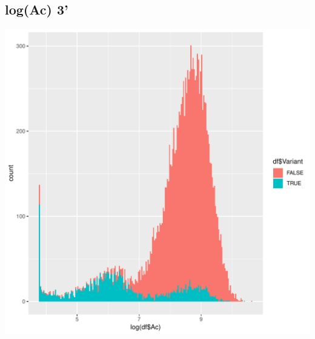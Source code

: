 \documentclass{article}\usepackage[]{graphicx}\usepackage[]{color}
\newenvironment{knitrout}{}{} %
\begin{document}
\subsection{log(Ac) 3'}
\begin{knitrout}
\color{fgcolor}

{\centering \includegraphics[width=1\linewidth]{figure/minimal-dens_3-1} 

}



\end{knitrout}
\clearpage
\end{document}

